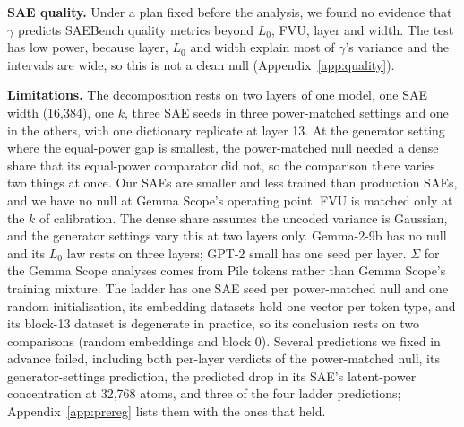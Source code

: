 \documentclass[10pt,twocolumn]{article}
\newcommand{\Sig}{\Sigma}
\newcommand{\Lz}{L_0}
\begin{document}
\textbf{SAE quality.} Under a plan fixed before the analysis, we found no evidence that $\gamma$ predicts SAEBench quality metrics beyond $\Lz$, FVU, layer and width. The test has low power, because layer, $\Lz$ and width explain most of $\gamma$'s variance and the intervals are wide, so this is not a clean null (Appendix~\ref{app:quality}).

\textbf{Limitations.} The decomposition rests on two layers of one model, one SAE width (16,384), one $k$, three SAE seeds in three power-matched settings and one in the others, with one dictionary replicate at layer 13. At the generator setting where the equal-power gap is smallest, the power-matched null needed a dense share that its equal-power comparator did not, so the comparison there varies two things at once. Our SAEs are smaller and less trained than production SAEs, and we have no null at Gemma Scope's operating point. FVU is matched only at the $k$ of calibration. The dense share assumes the uncoded variance is Gaussian, and the generator settings vary this at two layers only. Gemma-2-9b has no null and its $\Lz$ law rests on three layers; GPT-2 small has one seed per layer. $\Sig$ for the Gemma Scope analyses comes from Pile tokens rather than Gemma Scope's training mixture. The ladder has one SAE seed per power-matched null and one random initialisation, its embedding datasets hold one vector per token type, and its block-13 dataset is degenerate in practice, so its conclusion rests on two comparisons (random embeddings and block 0). Several predictions we fixed in advance failed, including both per-layer verdicts of the power-matched null, its generator-settings prediction, the predicted drop in its SAE's latent-power concentration at 32,768 atoms, and three of the four ladder predictions; Appendix~\ref{app:prereg} lists them with the ones that held.
\end{document}
